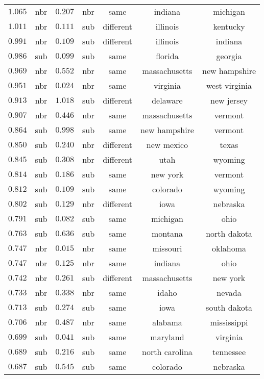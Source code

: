 \begin{table}[!htbp]
\begin{tabular}{@{\extracolsep{5pt}} ccccccc}
$1.065$ & nbr & $0.207$ & nbr & same & indiana & michigan \\ 
$1.011$ & nbr & $0.111$ & sub & different & illinois & kentucky \\ 
$0.991$ & nbr & $0.109$ & sub & different & illinois & indiana \\ 
$0.986$ & sub & $0.099$ & sub & same & florida & georgia \\ 
$0.969$ & nbr & $0.552$ & nbr & same & massachusetts & new hampshire \\ 
$0.951$ & nbr & $0.024$ & nbr & same & virginia & west virginia \\ 
$0.913$ & nbr & $1.018$ & sub & different & delaware & new jersey \\ 
$0.907$ & nbr & $0.446$ & nbr & same & massachusetts & vermont \\ 
$0.864$ & sub & $0.998$ & sub & same & new hampshire & vermont \\ 
$0.850$ & sub & $0.240$ & nbr & different & new mexico & texas \\ 
$0.845$ & sub & $0.308$ & nbr & different & utah & wyoming \\ 
$0.814$ & sub & $0.186$ & sub & same & new york & vermont \\ 
$0.812$ & sub & $0.109$ & sub & same & colorado & wyoming \\ 
$0.802$ & sub & $0.129$ & nbr & different & iowa & nebraska \\ 
$0.791$ & sub & $0.082$ & sub & same & michigan & ohio \\ 
$0.763$ & sub & $0.636$ & sub & same & montana & north dakota \\ 
$0.747$ & nbr & $0.015$ & nbr & same & missouri & oklahoma \\ 
$0.747$ & nbr & $0.125$ & nbr & same & indiana & ohio \\ 
$0.742$ & nbr & $0.261$ & sub & different & massachusetts & new york \\ 
$0.733$ & nbr & $0.338$ & nbr & same & idaho & nevada \\ 
$0.713$ & sub & $0.274$ & sub & same & iowa & south dakota \\ 
$0.706$ & nbr & $0.487$ & nbr & same & alabama & mississippi \\ 
$0.699$ & sub & $0.041$ & sub & same & maryland & virginia \\ 
$0.689$ & sub & $0.216$ & sub & same & north carolina & tennessee \\ 
$0.687$ & sub & $0.545$ & sub & same & colorado & nebraska \\ 

\end{tabular}
\end{table}
